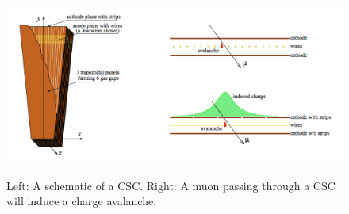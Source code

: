 \begin{figure}[H]
    \centering
    {\includegraphics[width=\textwidth]{Images/CMS/CSCDiagram.png}}
    \caption{Left: A schematic of a CSC. Right: A muon passing through a CSC will induce a charge avalanche.}
    \label{fig:CSCDiagram}
\end{figure}